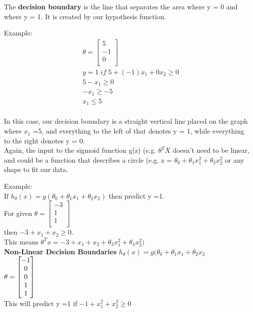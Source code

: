 The \textbf{decision boundary} is the line that separates the area where y = 0 and where y = 1. It is created by our hypothesis function.

Example:
\begin{equation}
  \begin{aligned}
    & \theta = \begin{bmatrix}
      5\\
      -1\\
      0\\
    \end{bmatrix}\\
     & y = 1 \; if \; 5 + (-1) x_1 + 0 x_2 \geq 0\\
     & 5 - x_1 \geq 0\\
     & - x_1 \geq -5\\
    & x_1 \leq 5\\
     \end{aligned}
\end{equation}

In this case, our decision boundary is a straight vertical line placed on the graph where $x_1$ =5, and everything to the left of that denotes y = 1, while everything to the right denotes y = 0.\\

Again, the input to the sigmoid function g(z) (e.g. $\theta^T X$ doesn't need to be linear, and could be a function that describes a circle (e.g. z = $\theta_0 + \theta_1 x_1^2 +\theta_2 x_2^2$ or any shape to fit our data.

Example:\\
If $h_{\theta}(x) = g(\theta_{0} + \theta_{1}x_{1} + \theta_{2}x_{2})$ then predict y =1.\\
For given $ \theta = \begin{bmatrix}
  -3\\
  1\\
  1\\
\end{bmatrix}$\\
then $ -3 + x_{1} + x_{2} \geq 0 $.\\
This means $\theta^{T}x = -3 + x_{1} + x_{2} + \theta_{3}x_{1}^{2} + \theta_{4}x_{2}^{2})$\\

\textbf{Non-Linear Decision Boundaries}
$h_{\theta}(x) = g(\theta_{0} + \theta_{1}x_{1} + \theta_{2}x_{2}$\\
$
\begin{aligned}
  & \theta = \begin{bmatrix}
    -1\\
    0\\
    0\\
    1\\
    1\\
  \end{bmatrix}
\end{aligned}\\
$\\
This will predict y =1 if $-1 + x_{1}^{2} + x_{2}^{2} \geq 0$

